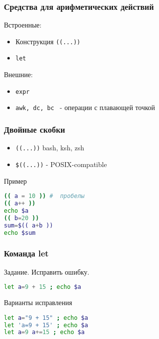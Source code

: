 
\begin{frame}[fragile]
  \frametitle{Средства для арифметических действий}
Встроенные:
  \begin{itemize}
   \item  Конструкция {\tt ((...))}
   \item  {\tt let}
  \end{itemize}
Внешние:
  \begin{itemize}
   \item  {\tt expr }  
   \item  {\tt awk, dc, bc } - операции с плавающей точкой
  \end{itemize}
\end{frame}

\begin{frame}[fragile]
  \frametitle{Двойные скобки}
  \begin{itemize}
   \item  {\tt ((...))} bash, ksh, zsh
   \item  {\tt \$((...))} - POSIX-compatible
  \end{itemize}
    \begin{block}{Пример}
        \begin{lstlisting}[language=Bash]
(( a = 10 )) #  пробелы
(( a++ ))
echo $a
(( b=20 ))
sum=$(( a+b ))
echo $sum
        \end{lstlisting}
    \end{block}
\end{frame}

\begin{frame}[fragile]
  \frametitle{Команда let}
   \begin{block}{Задание. Исправить ошибку.}
        \begin{lstlisting}[language=Bash]
let a=9 + 15 ; echo $a
        \end{lstlisting}
   \end{block}
\pause
   \begin{block}{Варианты исправления}
        \begin{lstlisting}[language=Bash]
let a="9 + 15" ; echo $a
let 'a=9 + 15' ; echo $a
let a=9 a+=15 ; echo $a
        \end{lstlisting}
   \end{block}
\end{frame}

